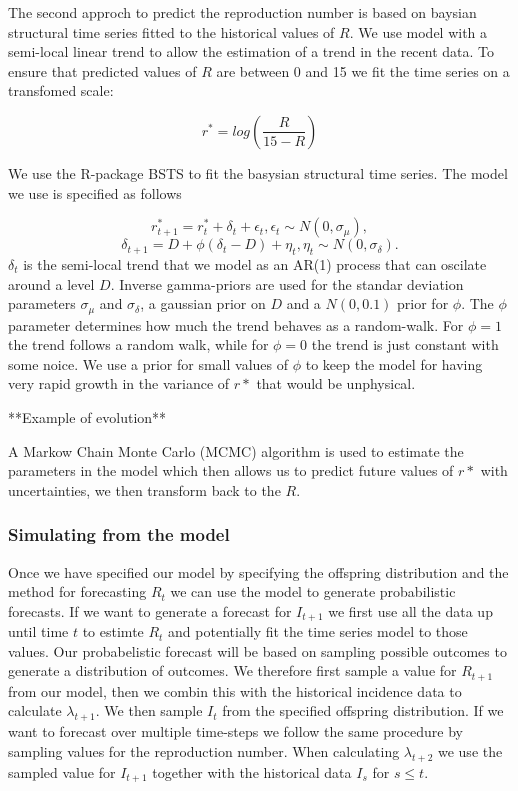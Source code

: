 \documentclass[12pt]{article}
\begin{document}
The second approch to predict the reproduction number is based on baysian structural time series fitted to the historical values of $R$. We use model with a semi-local linear trend to allow the estimation of a trend in the recent data. To ensure that predicted values of $R$ are between 0 and 15 we fit the time series on a transfomed scale:

\[ r^* = log\left(\frac{R}{15 - R}\right)\]

We use the R-package BSTS \cite{scottBstsBayesianStructural2019} to fit the basysian structural time series. The model we use is specified as follows

\[r^*_{t+1} = r^*_t + \delta_t + \epsilon_t, \epsilon_t \sim N(0, \sigma_\mu),\]
\[\delta_{t+1} = D + \phi(\delta_t - D) + \eta_t, \eta_t \sim N(0, \sigma_\delta).\]
$\delta_t$ is the semi-local trend that we model as an AR(1) process that can oscilate around a level $D$. Inverse gamma-priors are used for the standar deviation parameters $\sigma_\mu$ and $\sigma_\delta$, a gaussian prior on $D$ and a $N(0, 0.1)$ prior for $\phi$. The $\phi$ parameter determines how much the trend behaves as a random-walk. For $\phi=1$ the trend follows a random walk, while for $\phi=0$ the trend is just constant with some noice. We use a prior for small values of $\phi$ to keep the model for having very rapid growth in the variance of $r*$ that would be unphysical. 

**Example of evolution**

A Markow Chain Monte Carlo (MCMC) algorithm is used to estimate the parameters in the model which then allows us to predict future values of $r*$ with uncertainties, we then transform back to the $R$. 


\subsubsection{Simulating from the model}
Once we have specified our model by specifying the offspring distribution and the method for forecasting $R_t$ we can use the model to generate probabilistic forecasts. If we want to generate a forecast for $I_{t+1}$ we first use all the data up until time $t$ to estimte $R_t$ and potentially fit the time series model to those values. Our probabelistic forecast will be based on sampling possible outcomes to generate a distribution of outcomes. We therefore first sample a value for $R_{t+1}$ from our model, then we combin this with the historical incidence data to calculate $\lambda_{t+1}$. We then sample $I_t$ from the specified offspring distribution. If we want to forecast over multiple time-steps we follow the same procedure by sampling values for the reproduction number. When calculating $\lambda_{t+2}$ we use the sampled value for $I_{t+1}$ together with the historical data ${I_s}$ for $s\leq t$. 
\end{document}
